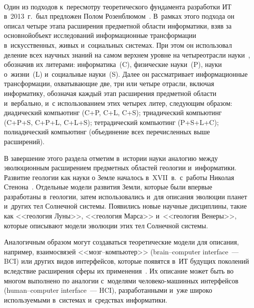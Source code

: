 \begin{multicols}{2}
  \begin{figure*}[b] %
  \vspace*{1pt}
    \begin{center}  
  \mbox{%
 \epsfxsize=136.145mm 
 }
\end{center}
\vspace*{-9pt}
  \end{figure*}
  
  
  Один из подходов к~пересмотру теоретического фундамента разработки 
ИТ в~2013~г.\ был предложен Полом 
Розенблюмом~\cite{12-zat}. В~рамках этого под\-хода он описал четыре этапа 
расширения предметной области информатики, взяв за основной\linebreak объект 
исследований информационные трансформации в~искусственных, живых 
и~социальных сис\-те\-мах. При этом он использовал деление всех научных 
знаний на самом верхнем уровне на четыре\linebreak отрас\-ли науки~\cite{13-zat}, 
обозначив их литерами: информатика~(C), физические науки~(P), науки 
о~жизни~(L) и~социальные науки~(S). Далее он рассматривает 
информационные трансформации, охватывающие две, три или четыре отрасли, 
вклю\-чая информатику, обозначая каж\-дый этап расширения предметной 
об\-ласти и~вербально, и~с использованием этих четырех литер, сле\-ду\-ющим 
образом: диадический компьютинг (C\;+\;P, C\;+\;L, C\;+\;S); триадический 
компьютинг (C\;+\;P\;+\;S, C\;+\;P\;+\;L, C\;+\;L\;+\;S); тетрадический 
компьютинг (P\;+\;S\;+\;L\;+\;C); полиадический компьютинг (объединение всех 
перечисленных выше расширений).
  
  В завершение этого раздела отметим в~истории науки аналогию между 
эволюционным расширением предметных областей геологии и~информатики. 
Развитие геологии как науки о Земле началось в~XVII~в.\ с~работы Николая 
Стенона~\cite{14-zat}. Отдельные модели развития Земли, которые были 
впервые разработаны в~геологии, затем использовались и~для описания 
эволюции планет и~других тел Солнечной системы. Появились новые научные 
дисциплины, такие как <<геология Луны>>, <<геология Марса>> и~<<геология 
Венеры>>, которые описывают модели эволюции этих тел Солнечной системы.
  
  Аналогичным образом могут создаваться теоретические модели для 
описания, например, взаимосвязей <<мозг--ком\-пью\-тер>> (brain--computer 
interface~--- BCI) или других видов интерфейсов, которые появятся в~ИТ 
будущих поколений вследствие расширения сферы их  
применения~\cite{15-zat}. Их описание может быть во многом выполнено по 
аналогии с~моделями че\-ло\-ве\-ко-ма\-шин\-ных интерфейсов (human--computer 
interface~--- HCI), разработанными и~уже широко используемыми в~системах 
и~средствах информатики. 


\end{multicols}
